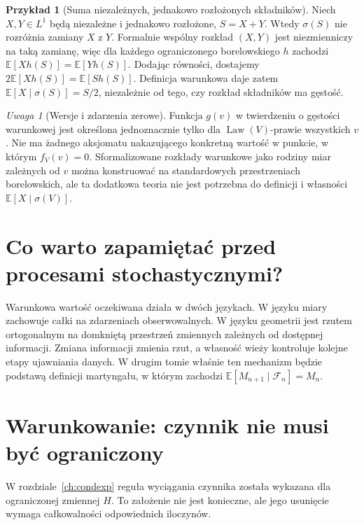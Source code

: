 \documentclass[11pt,a4paper,oneside]{report}
\numberwithin{equation}{chapter}
\theoremstyle{plain}
\theoremstyle{definition}
\newtheorem{przyklad}{Przykład}[chapter]
\theoremstyle{remark}
\newtheorem{uwaga}{Uwaga}[chapter]
\newcommand{\E}{\mathbb{E}}
\newcommand{\Law}{\operatorname{Law}}
\begin{document}
\begin{przyklad}[Suma niezależnych, jednakowo rozłożonych składników]
Niech $X,Y\in L^1$ będą niezależne i jednakowo
rozłożone, $S=X+Y$. Wtedy $\sigma(S)$
nie rozróżnia zamiany $X$ z $Y$. Formalnie
wspólny rozkład $(X,Y)$ jest niezmienniczy na taką
zamianę, więc dla każdego ograniczonego
borelowskiego $h$ zachodzi
$\E[Xh(S)]=\E[Yh(S)]$.
Dodając równości, dostajemy
$2\E[Xh(S)]=\E[Sh(S)]$. Definicja warunkowa
daje zatem $\E[X\mid\sigma(S)]=S/2$,
niezależnie od tego, czy rozkład składników ma gęstość.
\end{przyklad}

\begin{uwaga}[Wersje i zdarzenia zerowe]
Funkcja $g(v)$ w twierdzeniu o gęstości warunkowej
jest określona jednoznacznie tylko dla
$\Law(V)$-prawie wszystkich $v$. Nie ma żadnego
aksjomatu nakazującego konkretną wartość w punkcie,
w którym $f_V(v)=0$. Sformalizowane rozkłady
warunkowe jako rodziny miar zależnych od $v$
można konstruować na standardowych przestrzeniach
borelowskich, ale ta dodatkowa teoria nie jest
potrzebna do definicji i własności
$\E[X\mid\sigma(V)]$.
\end{uwaga}

\section{Co warto zapamiętać przed procesami stochastycznymi?}
Warunkowa wartość oczekiwana działa w dwóch językach.
W języku miary zachowuje całki na zdarzeniach
obserwowalnych. W języku geometrii jest rzutem
ortogonalnym na domkniętą przestrzeń zmiennych
zależnych od dostępnej informacji. Zmiana informacji
zmienia rzut, a własność wieży kontroluje kolejne
etapy ujawniania danych. W drugim tomie właśnie
ten mechanizm będzie podstawą definicji martyngału,
w którym zachodzi $\E[M_{n+1}\mid\mathcal F_n]=M_n$.

\section{Warunkowanie: czynnik nie musi być ograniczony}

W rozdziale~\ref{ch:condexp} reguła wyciągania czynnika została wykazana dla
ograniczonej zmiennej $H$. To założenie nie jest konieczne, ale jego
usunięcie wymaga całkowalności odpowiednich iloczynów.
\end{document}

